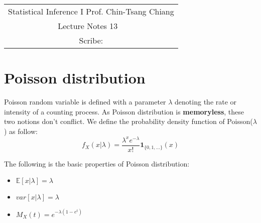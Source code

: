 \documentclass[../Distributions.tex]{subfiles}
\begin{document}
	\begin{center}
		\renewcommand{\arraystretch}{2}
		\begin{bfseries}
			\begin{tabular}{|c|}
				\hline
				Statistical Inference I \hfill Prof. Chin-Tsang Chiang\\
				\hspace{15em} {\large Lecture Notes 13} \hspace{15em}\ \\
				\lecdate \hfill Scribe: \scribe\\
				\hline
			\end{tabular}
			\renewcommand{\arraystretch}{1}
		\end{bfseries}
	\end{center}
\section{Poisson distribution}
Poisson random variable is defined with a parameter $\lambda$ denoting the rate or intensity of a counting process. As Poisson distribution is {\bf memoryless}, these two notions don't conflict. We define the probability density function of Poisson($\lambda$) as follow:
$$f_X(x|\lambda) = \frac{\lambda^x e^{-\lambda}}{x!}\mathbf{1}_{\{0,1,...\}}(x)$$

\noindent The following is the basic properties of Poisson distribution:
\begin{itemize}
	\item $\mathbb{E}[x|\lambda] = \lambda$
	\item $var[x|\lambda]=\lambda$
	\item $M_X(t) = e^{-\lambda(1-e^t)}$
\end{itemize}
\end{document}
